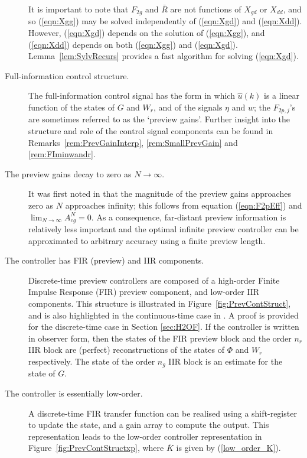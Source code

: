 \begin{description}
It is important to note that $F_{2g}$ and $\bar R$ are not functions of $X_{gd}$ or $X_{dd}$, and so (\ref{eqn:Xgg}) may be solved independently of (\ref{eqn:Xgd}) and (\ref{eqn:Xdd}). However, (\ref{eqn:Xgd}) depends on the solution of (\ref{eqn:Xgg}), and (\ref{eqn:Xdd}) depends on both (\ref{eqn:Xgg}) and (\ref{eqn:Xgd}). Lemma~\ref{lem:SylvRecurs} provides a fast algorithm for solving (\ref{eqn:Xgd}).
\item[Full-information control structure.] The full-information control signal has the form
in which $\hat u(k)$ is a linear function of the states of $G$ and $W_r$, and of the signals $\eta$ and $w$; the $F_{2p,j}$'s are sometimes referred to as the `preview gains'. Further insight into the structure and role of the control signal components can be found in Remarks~\ref{rem:PrevGainInterp}, \ref{rem:SmallPrevGain} and \ref{rem:FIminwandr}.
\item[The preview gains decay to zero as $N \rightarrow \infty$.] It was first noted in \cite{Tomizuka_1975_OptDiscretePreview} that the magnitude of the preview gains approaches zero as $N$ approaches infinity; this follows from equation (\ref{eqn:F2pEff}) and $\lim_{N \rightarrow \infty} A^N_{cg} = 0$. As a consequence, far-distant preview information is relatively less important and the optimal infinite preview controller can be approximated  to arbitrary accuracy using a finite preview length.
\item[The controller has FIR (preview) and IIR components.]
Discrete-time preview controllers are composed of a high-order Finite Impulse Response (FIR) preview component, and low-order {IIR} components. This structure is illustrated in Figure~\ref{fig:PrevContStruct}, and is also highlighted in the continuous-time case in \cite{Moelja_2006_H2PreviewMultiple}. A proof is provided for the discrete-time case in Section \ref{sec:H2OF}. If the controller is written in observer form, then the states of the FIR preview block and the order $n_r$ IIR block are (perfect) reconstructions of the states of $\Phi$ and $W_r$ respectively. The state of the order $n_g$ IIR block is an estimate for the state of $G$.
\item[The controller is essentially low-order.] 
A discrete-time FIR transfer function can be realised using a shift-register to update the state, and a gain array to compute the output. This representation leads to the low-order controller representation in Figure~\ref{fig:PrevContStructxp}, where $\bar{K}$ is given by (\ref{low_order_K}). 

\end{description}
